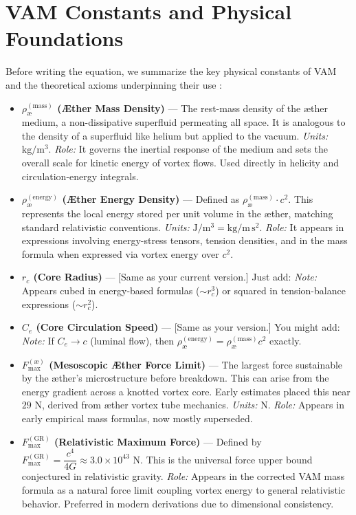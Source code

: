     \bigskip

    \section{VAM Constants and Physical Foundations}

    Before writing the equation, we summarize the key physical constants of VAM and the theoretical axioms underpinning their use \cite{Iskandarani2025a,Iskandarani2025b}:

\begin{itemize}
    \item \textbf{$\rho_{\text{\ae}}^{(\mathrm{mass})}$ (Æther Mass Density)} — The rest-mass density of the æther medium, a non-dissipative superfluid permeating all space. It is analogous to the density of a superfluid like helium but applied to the vacuum. \textit{Units:} $\mathrm{kg/m^3}$. \textit{Role:} It governs the inertial response of the medium and sets the overall scale for kinetic energy of vortex flows. Used directly in helicity and circulation-energy integrals.

    \item \textbf{$\rho_{\text{\ae}}^{(\mathrm{energy})}$ (Æther Energy Density)} — Defined as $\rho_{\text{\ae}}^{(\mathrm{mass})} \cdot c^2$. This represents the local energy stored per unit volume in the æther, matching standard relativistic conventions. \textit{Units:} $\mathrm{J/m^3} = \mathrm{kg/m\,s^2}$. \textit{Role:} It appears in expressions involving energy-stress tensors, tension densities, and in the mass formula when expressed via vortex energy over $c^2$.

    \item \textbf{$r_c$ (Core Radius)} — [Same as your current version.] Just add: \textit{Note:} Appears cubed in energy-based formulas ($\sim r_c^3$) or squared in tension-balance expressions ($\sim r_c^2$).

    \item \textbf{$C_e$ (Core Circulation Speed)} — [Same as your version.] You might add: \textit{Note:} If $C_e \to c$ (luminal flow), then $\rho_{\text{\ae}}^{(\mathrm{energy})} = \rho_{\text{\ae}}^{(\mathrm{mass})} c^2$ exactly.

    \item \textbf{$F_{\max}^{(\text{\ae})}$ (Mesoscopic Æther Force Limit)} — The largest force sustainable by the æther's microstructure before breakdown. This can arise from the energy gradient across a knotted vortex core. Early estimates placed this near $29$ N, derived from æther vortex tube mechanics. \textit{Units:} N. \textit{Role:} Appears in early empirical mass formulas, now mostly superseded.

    \item \textbf{$F_{\max}^{(\mathrm{GR})}$ (Relativistic Maximum Force)} — Defined by $F_{\max}^{(\mathrm{GR})} = \dfrac{c^4}{4G} \approx 3.0 \times 10^{43}$ N. This is the universal force upper bound conjectured in relativistic gravity. \textit{Role:} Appears in the corrected VAM mass formula as a natural force limit coupling vortex energy to general relativistic behavior. Preferred in modern derivations due to dimensional consistency.
\end{itemize}


